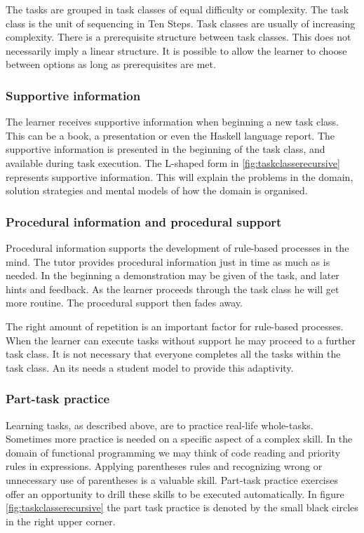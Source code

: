 The tasks are grouped in task classes  of equal difficulty or complexity.
The task class is the unit of sequencing in Ten Steps. 
Task classes are usually of increasing complexity.  There is a prerequisite structure between task classes.
This does not necessarily imply a linear structure. 
It is possible to allow the learner to choose between options as long as prerequisites are met.

\subsubsection{Supportive information}
The learner receives supportive information when beginning a new task class. 
This can be a book, a presentation or even the Haskell language report.
The supportive information is presented in the beginning of the task class, and available during task execution.
The L-shaped form in \ref{fig:taskclasserecursive} represents supportive information.
This will explain the problems in the domain, solution strategies and mental models of how the domain is organised.


\subsubsection{Procedural information and procedural support}
\label{procsupport}
Procedural information supports the development of rule-based processes in the mind.
The tutor provides procedural information just in time as much as is needed.
In the beginning a demonstration may be given of the task, and later hints and feedback.
As the learner proceeds through the task class he will get more routine.
The procedural support then fades away.

The right amount of repetition is an important factor for rule-based processes.
When the learner can execute tasks without support he may proceed to a further task class.
It is not necessary that everyone completes all the tasks within the task class.
An \gls{its} needs a student model to provide this adaptivity.

\subsubsection{Part-task practice}

Learning tasks, as described above, are to practice real-life whole-tasks. 
Sometimes more practice is needed on a specific aspect of a complex skill.
In the domain of functional programming we may think of code reading and priority rules in expressions.
Applying parentheses rules and recognizing wrong or unnecessary use of parentheses is a valuable skill.
Part-task practice exercises offer an opportunity to drill these skills to be executed automatically.
In figure \ref{fig:taskclasserecursive} the part task practice is denoted by the small black circles in the right upper corner.



